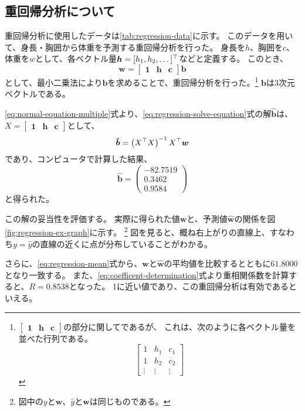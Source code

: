 \subsection{重回帰分析について}
重回帰分析に使用したデータは\ref{tab:regression-data}に示す。
このデータを用いて、身長・胸囲から体重を予測する重回帰分析を行った。
身長を$h$、胸囲を$c$、体重を$w$として、各ベクトル量$\bm{h}=[h_1, h_2, \dots]^{\top}$などと定義する。
このとき、
\begin{equation}\label{eq:regression-solve-equation}
	\bm{w} = \begin{bmatrix} \bm{1} & \bm{h} & \bm{c} \end{bmatrix} \bm{b}
\end{equation}
として、最小二乗法により$\bm{b}$を求めることで、重回帰分析を行った。\footnote{
	$\begin{bmatrix} \bm{1} & \bm{h} & \bm{c} \end{bmatrix}$の部分に関してであるが、
	これは、次のように各ベクトル量を並べた行列である。
	\begin{equation*}
		\begin{bmatrix} 1 & h_1 & c_1 \\ 1 & h_2 & c_2 \\ \vdots & \vdots & \vdots \end{bmatrix}
	\end{equation*}
}
$\bm{b}$は3次元ベクトルである。

\ref{eq:normal-equation-multiple}式より、\ref{eq:regression-solve-equation}式の解$\bm{\hat{b}}$は、
$X=\begin{bmatrix}\bm{1} & \bm{h} & \bm{c}\end{bmatrix}$として、
\begin{equation}
	\bm{\hat{b}} = \left( X^{\top}X \right)^{-1} X^{\top} \bm{w}
\end{equation}
であり、コンピュータで計算した結果、
\begin{equation}\label{eq:regression-result}
	\bm{\hat{b}} = \begin{pmatrix}
		-82.7519 \\
		0.3462   \\
		0.9584
	\end{pmatrix}
\end{equation}
と得られた。

この解の妥当性を評価する。
実際に得られた値$\bm{w}$と、予測値$\bm{\hat{w}}$の関係を図\ref{fig:regression-ex-graph}に示す。
\footnote{
	図中の$y$と$\bm{w}$、$\hat{y}$と$\bm{\hat{w}}$は同じものである。
}
図を見ると、概ね右上がりの直線上、すなわち$y=\hat{y}$の直線の近くに点が分布していることがわかる。

さらに、\ref{eq:regression-mean}式から、$\bm{w}$と$\bm{\hat{w}}$の平均値を比較するとともに$61.8000$となり一致する。
また、\ref{eq:coefficent-determination}式より重相関係数を計算すると、$R=0.8538$となった。
1に近い値であり、この重回帰分析は有効であるといえる。
